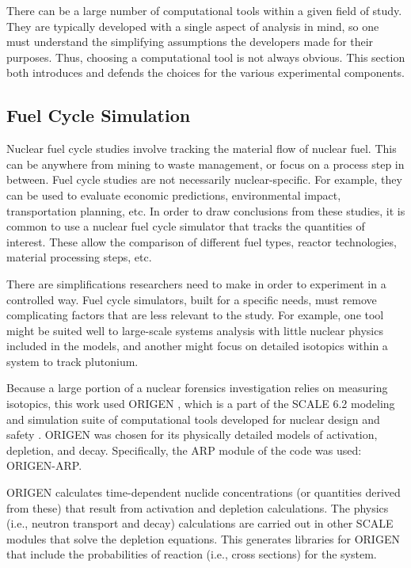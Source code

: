 There can be a large number of computational tools within a given field of
study.  They are typically developed with a single aspect of analysis in mind,
so one must understand the simplifying assumptions the developers made for
their purposes. Thus, choosing a computational tool is not always obvious. This
section both introduces and defends the choices for the various experimental
components.

\subsection{Fuel Cycle Simulation}

Nuclear fuel cycle studies involve tracking the material flow of nuclear fuel.
This can be anywhere from mining to waste management, or focus on a process
step in between. Fuel cycle studies are not necessarily nuclear-specific. For
example, they can be used to evaluate economic predictions, environmental
impact, transportation planning, etc.  In order to draw conclusions from these
studies, it is common to use a nuclear fuel cycle simulator that tracks the
quantities of interest. These allow the comparison of different fuel types,
reactor technologies, material processing steps, etc. 

There are simplifications researchers need to make in order to experiment in a
controlled way. Fuel cycle simulators, built for a specific needs, must remove
complicating factors that are less relevant to the study.  For example, one
tool might be suited well to large-scale systems analysis with little nuclear
physics included in the models, and another might focus on detailed isotopics
within a system to track plutonium.

Because a large portion of a nuclear forensics investigation relies on
measuring isotopics, this work used \gls{ORIGEN} \cite{origen}, which is a part
of the \gls{SCALE} 6.2 modeling and simulation suite of computational tools
developed for nuclear design and safety \cite{scale}. \gls{ORIGEN} was chosen
for its physically detailed models of activation, depletion, and decay.
Specifically, the ARP module of the code was used: \gls{ORIGEN-ARP}.

\gls{ORIGEN} calculates time-dependent nuclide concentrations (or quantities
derived from these) that result from activation and depletion calculations. The
physics (i.e., neutron transport and decay) calculations are carried out in
other \gls{SCALE} modules that solve the depletion equations.  This generates
libraries for \gls{ORIGEN} that include the probabilities of reaction (i.e.,
cross sections) for the system.

